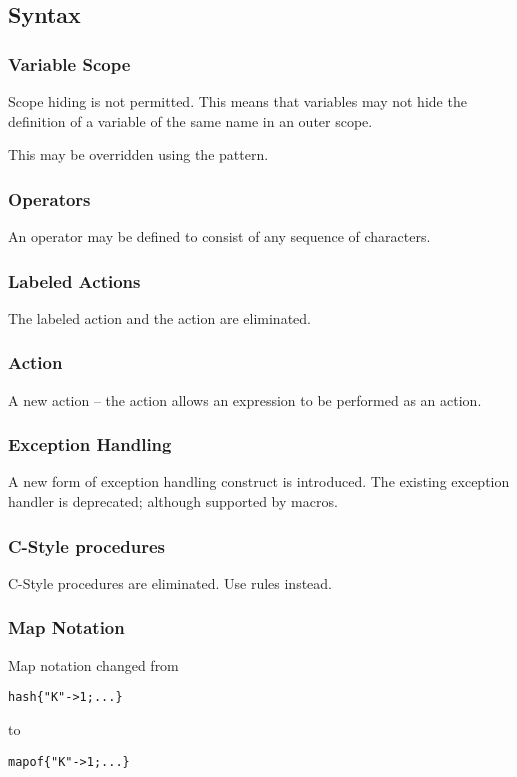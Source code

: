 \subsection{Syntax}
\subsubsection{Variable Scope}
Scope hiding is not permitted. This means that variables may not hide the definition of a variable of the same name in an outer scope.

This may be overridden using the  pattern.

\subsubsection{Operators}
An operator may be defined to consist of any sequence of characters.

\subsubsection{Labeled Actions}
The labeled action and the  action are eliminated.

\subsubsection{ Action}
A new action -- the   action allows an expression to be performed as an action.

\subsubsection{Exception Handling}
A new form of exception handling construct is introduced. The existing exception handler is deprecated; although supported by macros.

\subsubsection{C-Style procedures}
C-Style procedures are eliminated. Use  rules instead.

\subsubsection{Map Notation}
Map notation changed from
\begin{alltt}
hash\{ "K"->1; ... \}
\end{alltt}
to
\begin{alltt}
map of \{"K"->1; ... \}
\end{alltt}

